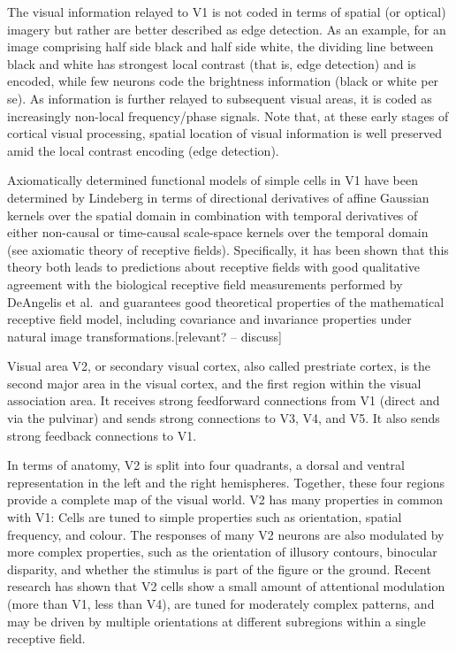 The visual information relayed to V1 is not coded in terms of spatial (or optical) imagery but rather are better described as edge detection. As an example, for an image comprising half side black and half side white, the dividing line between black and white has strongest local contrast (that is, edge detection) and is encoded, while few neurons code the brightness information (black or white per se). As information is further relayed to subsequent visual areas, it is coded as increasingly non-local frequency/phase signals. Note that, at these early stages of cortical visual processing, spatial location of visual information is well preserved amid the local contrast encoding (edge detection).

Axiomatically determined functional models of simple cells in V1 have been determined by Lindeberg in terms of directional derivatives of affine Gaussian kernels over the spatial domain in combination with temporal derivatives of either non-causal or time-causal scale-space kernels over the temporal domain (see axiomatic theory of receptive fields). Specifically, it has been shown that this theory both leads to predictions about receptive fields with good qualitative agreement with the biological receptive field measurements performed by DeAngelis et al.~and guarantees good theoretical properties of the mathematical receptive field model, including covariance and invariance properties under natural image transformations.{[}relevant? -- discuss{]}

Visual area V2, or secondary visual cortex, also called prestriate cortex, is the second major area in the visual cortex, and the first region within the visual association area. It receives strong feedforward connections from V1 (direct and via the pulvinar) and sends strong connections to V3, V4, and V5. It also sends strong feedback connections to V1.

In terms of anatomy, V2 is split into four quadrants, a dorsal and ventral representation in the left and the right hemispheres. Together, these four regions provide a complete map of the visual world. V2 has many properties in common with V1: Cells are tuned to simple properties such as orientation, spatial frequency, and colour. The responses of many V2 neurons are also modulated by more complex properties, such as the orientation of illusory contours, binocular disparity, and whether the stimulus is part of the figure or the ground. Recent research has shown that V2 cells show a small amount of attentional modulation (more than V1, less than V4), are tuned for moderately complex patterns, and may be driven by multiple orientations at different subregions within a single receptive field.

